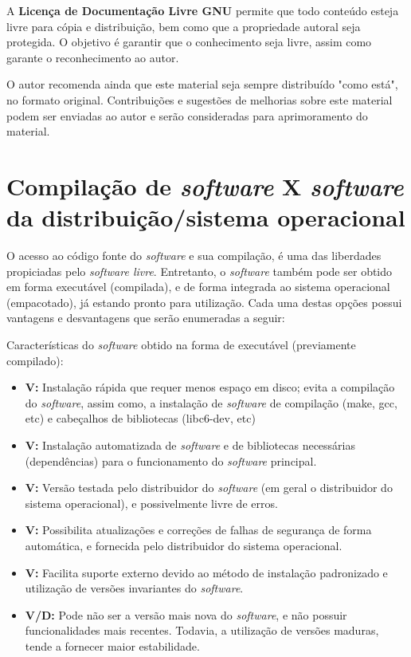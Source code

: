     A {\bf Licença de Documentação Livre GNU} permite que todo conteúdo
esteja livre para cópia e distribuição, bem como que a propriedade autoral
seja protegida. O objetivo é garantir que o conhecimento seja livre, assim
como garante o reconhecimento ao autor.

     O autor recomenda ainda que este material seja sempre distribuído
"como está", no formato original. Contribuições e sugestões de melhorias
sobre este material podem ser enviadas ao autor e serão consideradas para
aprimoramento do material.

\section{Compilação de {\it software} X {\it software} da distribuição/sistema operacional}\setcounter{SteP}{1}

    O acesso ao código fonte do {\it software} e sua compilação, é uma das
liberdades propiciadas pelo {\it software livre}. Entretanto, o {\it software}
também pode ser obtido em forma executável (compilada), e de forma integrada
ao sistema operacional (empacotado), já estando pronto para utilização.
Cada uma destas opções possui vantagens e desvantagens que serão enumeradas
a seguir:

    Características do {\it software} obtido na forma de executável (previamente compilado):

\begin{itemize}
\item{\bf } {\bf V:} Instalação rápida que requer menos espaço em disco; evita a
compilação do {\it software}, assim como, a instalação de {\it software} de compilação
(make, gcc, etc) e cabeçalhos de bibliotecas (libc6-dev, etc)

\item{\bf } {\bf V:} Instalação automatizada de {\it software} e de bibliotecas
necessárias (dependências) para o funcionamento do {\it software} principal.

\item{\bf } {\bf V:} Versão testada pelo distribuidor do {\it software} (em geral
o distribuidor do sistema operacional), e possivelmente livre de erros.

\item{\bf } {\bf V:} Possibilita atualizações e correções de falhas de segurança
de forma automática, e fornecida pelo distribuidor do sistema operacional.

\item{\bf } {\bf V:} Facilita suporte externo devido ao método de instalação
padronizado e utilização de versões invariantes do {\it software}.

\item{\bf } {\bf V/D:} Pode não ser a versão mais nova do {\it software}, e não
possuir funcionalidades mais recentes. Todavia, a utilização de versões 
maduras, tende a fornecer maior estabilidade.

\end{itemize}


